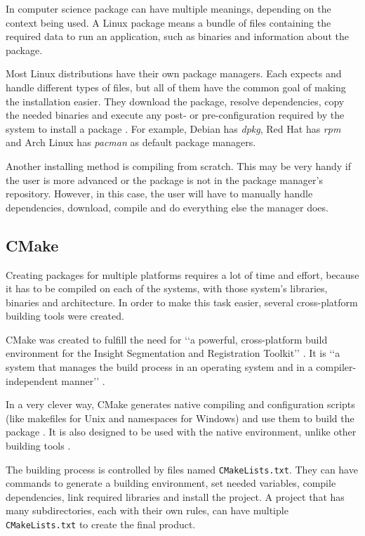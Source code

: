 In computer science package can have multiple meanings, depending on the context being used. A Linux package means a bundle of files containing the required data to run an application, such as binaries and information about the package.

Most Linux distributions have their own package managers. Each expects and handle different types of files, but all of them have the common goal of making the installation easier. They download the package, resolve dependencies, copy the needed binaries and execute any post- or pre-configuration required by the system to install a package \cite{linode2017linux}. For example, Debian has \textit{dpkg}, Red Hat has \textit{rpm} and Arch Linux has \textit{pacman} as default package managers.

Another installing method is compiling from scratch. This may be very handy if the user is more advanced or the package is not in the package manager's repository. However, in this case, the user will have to manually handle dependencies, download, compile and do everything else the manager does.

\subsection{CMake}
\label {sec:cmake}

Creating packages for multiple platforms requires a lot of time and effort, because it has to be compiled on each of the systems, with those system's libraries, binaries and architecture. In order to make this task easier, several cross-platform building tools were created.

CMake was created to fulfill the need for \lq\lq a powerful, cross-platform build environment for the Insight Segmentation and Registration Toolkit\rq\rq{} \cite{cmake2017overview}. It is \lq\lq a system that manages the build process in an operating system and in a compiler-independent manner\rq\rq{} \cite{cmake2017overview}.

In a very clever way, CMake generates native compiling and configuration scripts (like makefiles for Unix and namespaces for Windows) and use them to build the package \cite{cmake2017overview}. It is also designed to be used with the native environment, unlike other building tools \cite{cmake2017overview}.

The building process is controlled by files named \texttt{CMakeLists.txt}. They can have commands to generate a building environment, set needed variables, compile dependencies, link required libraries and install the project. A project that has many subdirectories, each with their own rules, can have multiple \texttt{CMakeLists.txt} to create the final product.
